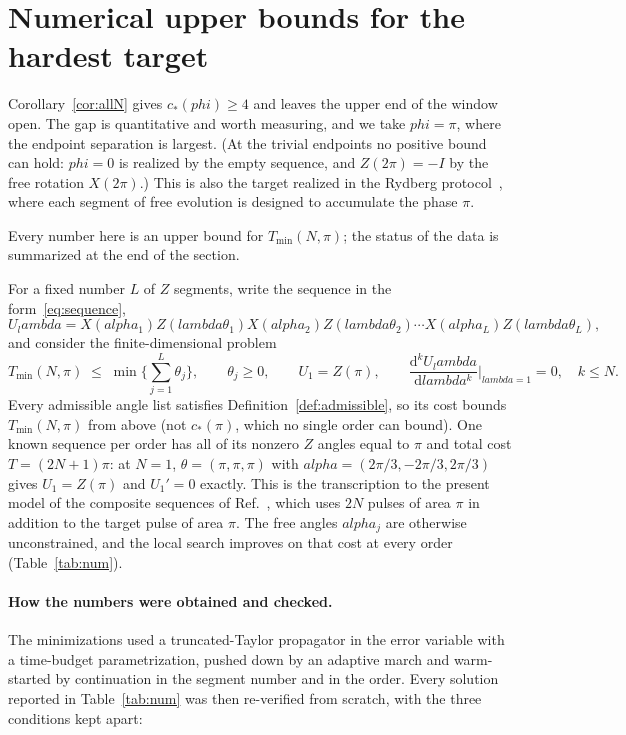 \documentclass[%
  aps,
  pra,
  preprint,
  superscriptaddress,
  amsmath,amssymb,
  nofootinbib,
  floatfix,
]{revtex4-2}
\def\lambda{lambda}\def\tau{tau}\def\phi{phi}\def\alpha{alpha}%
\theoremstyle{definition}
\theoremstyle{remark}
\newcommand{\cstar}{c_*}
\begin{document}
\section{Numerical upper bounds for the hardest target}
\label{sec:numerics}

Corollary~\ref{cor:allN} gives $\cstar(\phi)\ge4$ and leaves the upper end of the window open. The
gap is quantitative and worth measuring, and we take $\phi=\pi$, where the endpoint
separation is largest. (At the trivial endpoints no positive bound can hold: $\phi=0$ is realized
by the empty sequence, and $Z(2\pi)=-I$ by the free rotation $X(2\pi)$.) This is also
the target realized in the Rydberg protocol~\cite{Ye2026}, where each segment of free evolution is designed to
accumulate the phase $\pi$.

Every number here is an upper bound for $T_{\min}(N,\pi)$; the status of the data is summarized at the end of the section.

For a fixed number $L$ of $Z$ segments, write the sequence in the form~\eqref{eq:sequence},
\[
U_\lambda
=X(\alpha_1)Z(\lambda\theta_1)X(\alpha_2)Z(\lambda\theta_2)\cdots X(\alpha_L)Z(\lambda\theta_L),
\]
and consider the finite-dimensional problem
\begin{equation}
T_{\min}(N,\pi)\;\le\;\min\Big\{\sum_{j=1}^L\theta_j\Big\} ,
\qquad
\theta_j\ge0,
\qquad
U_1=Z(\pi),
\qquad
\frac{\mathrm{d}^kU_\lambda}{\mathrm{d}\lambda^k}\Big|_{\lambda=1}=0,\quad k\le N .
\label{eq:numproblem}
\end{equation}
Every admissible angle list satisfies Definition~\ref{def:admissible}, so its cost bounds $T_{\min}(N,\pi)$ from above (not $\cstar(\pi)$, which no single order can bound). One known sequence per order has all of its nonzero $Z$ angles equal to $\pi$ and total cost
$T=(2N+1)\pi$: at $N=1$, $\theta=(\pi,\pi,\pi)$ with
$\alpha=(2\pi/3,-2\pi/3,2\pi/3)$ gives $U_1=Z(\pi)$ and $U_1'=0$ exactly. This is the
transcription to the present model of the composite sequences of Ref.~\cite{Low2014}, which
uses $2N$ pulses of area $\pi$ in addition to the target pulse of area $\pi$. The free angles
$\alpha_j$ are otherwise unconstrained, and the local search improves on that cost at every
order (Table~\ref{tab:num}).

\paragraph{How the numbers were obtained and checked.}
The minimizations used a truncated-Taylor propagator in the error variable with a
time-budget parametrization, pushed down by an adaptive march and
warm-started by continuation in the segment number and in the order. Every solution reported in
Table~\ref{tab:num} was then re-verified from scratch, with the three conditions kept apart:
\end{document}
